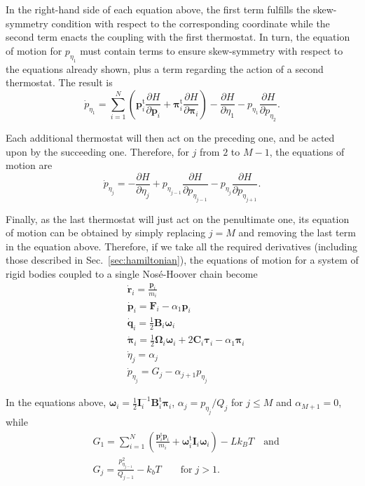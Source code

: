 \documentclass[aip,jcp,reprint,amsmath,amssymb]{revtex4-1}
\newcommand{\mt}[1]{\boldsymbol{\mathbf{#1}}}           %
\newcommand{\vt}[1]{\boldsymbol{\mathbf{#1}}}           %
\newcommand{\tr}[1]{#1^\text{t}}                               %
\newcommand{\diff}[2]{\dfrac{\partial #1}{\partial #2}} %
\begin{document}
In the right-hand side of each equation above, the first term fulfills the skew-symmetry condition with respect to the corresponding coordinate while the second term enacts the coupling with the first thermostat. In turn, the equation of motion for $p_{\eta_1}$ must contain terms to ensure skew-symmetry with respect to the equations already shown, plus a term regarding the action of a second thermostat. The result is
\[
{\dot p}_{\eta_1} = \sum_{i=1}^N \left( \tr{\vt p_i} \diff{H}{\vt p_i} + \tr{\vt \pi_i} \diff{H}{\vt \pi_i}\right) - \diff{H}{\eta_1} - p_{\eta_1} \diff{H}{p_{\eta_2}}.
\]

Each additional thermostat will then act on the preceding one, and be acted upon by the succeeding one. Therefore, for $j$ from $2$ to $M-1$, the equations of motion are
\[
{\dot p}_{\eta_j} = -\diff{H}{\eta_j} + p_{\eta_{j-1}} \diff{H}{p_{\eta_{j-1}}} - p_{\eta_j} \diff{H}{p_{\eta_{j+1}}}.
\]

Finally, as the last thermostat will just act on the penultimate one, its equation of motion can be obtained by simply replacing $j = M$ and removing the last term in the equation above. Therefore, if we take all the required derivatives (including those described in Sec.~\ref{sec:hamiltonian}), the equations of motion for a system of rigid bodies coupled to a single Nos\'{e}-Hoover chain become
\begin{subequations}
\label{eq:nhc_system}
\begin{align}
&\dot{\vt r}_i = \frac{{\vt p}_i}{m_i} \\ 
&\dot{\vt p}_i = {\vt F}_i - \alpha_1 \vt p_i \\
&\dot{\vt q}_i = \frac{1}{2} \mt B_i \vt \omega_i \label{eq:nhc_q} \\
&\dot{\vt \pi}_i = \frac{1}{2} \mt \Omega_i \vt \omega_i + 2 \mt C_i \vt \tau_i - \alpha_1 \vt \pi_i \label{eq:nhc_pi} \\
&\dot{\eta}_j = \alpha_j \\
&{\dot p}_{\eta_j} = G_j - \alpha_{j+1} p_{\eta_j}
\end{align}
\end{subequations}

In the equations above, ${\vt \omega}_i = \frac{1}{2} {\mt I}_i^{-1} \tr{\mt B}_i {\vt \pi}_i$, $\alpha_j = {p_{\eta_j}}/{Q_j}$ for $j \leq M$ and $\alpha_{M+1} = 0$, while
\begin{align*}
&G_1 = \sum_{i=1}^N \left( \frac{\tr{\vt p}_i{\vt p}_i}{m_i} + \tr{\vt \omega}_i \mt I_i \vt \omega_i \right) - L k_B T \quad \text{and}\\
&G_j = \frac{p_{\eta_{j-1}}^2}{Q_{j-1}} - k_b T \qquad \text{for} \; j > 1.
\end{align*}
\end{document}
